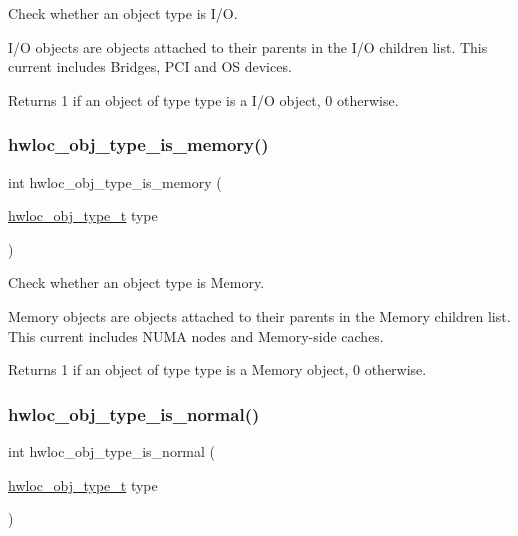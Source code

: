 Check whether an object type is I/O. 

I/O objects are objects attached to their parents in the I/O children list. This current includes Bridges, P\+CI and OS devices.

\begin{DoxyReturn}{Returns}
1 if an object of type {\ttfamily type} is a I/O object, 0 otherwise. 
\end{DoxyReturn}
\mbox{\label{a00198_ga1d074390c8a3dc3088d84f73fb73f966}} 
\subsubsection{\texorpdfstring{hwloc\+\_\+obj\+\_\+type\+\_\+is\+\_\+memory()}{hwloc\_obj\_type\_is\_memory()}}
{\footnotesize\ttfamily int hwloc\+\_\+obj\+\_\+type\+\_\+is\+\_\+memory (\begin{DoxyParamCaption}\item[{\hyperlink{a00184_gacd37bb612667dc437d66bfb175a8dc55}{hwloc\+\_\+obj\+\_\+type\+\_\+t}}]{type }\end{DoxyParamCaption})}



Check whether an object type is Memory. 

Memory objects are objects attached to their parents in the Memory children list. This current includes N\+U\+MA nodes and Memory-\/side caches.

\begin{DoxyReturn}{Returns}
1 if an object of type {\ttfamily type} is a Memory object, 0 otherwise. 
\end{DoxyReturn}
\mbox{\label{a00198_ga52ef38431eba383b048b98c669b59a16}} 
\subsubsection{\texorpdfstring{hwloc\+\_\+obj\+\_\+type\+\_\+is\+\_\+normal()}{hwloc\_obj\_type\_is\_normal()}}
{\footnotesize\ttfamily int hwloc\+\_\+obj\+\_\+type\+\_\+is\+\_\+normal (\begin{DoxyParamCaption}\item[{\hyperlink{a00184_gacd37bb612667dc437d66bfb175a8dc55}{hwloc\+\_\+obj\+\_\+type\+\_\+t}}]{type }\end{DoxyParamCaption})}



